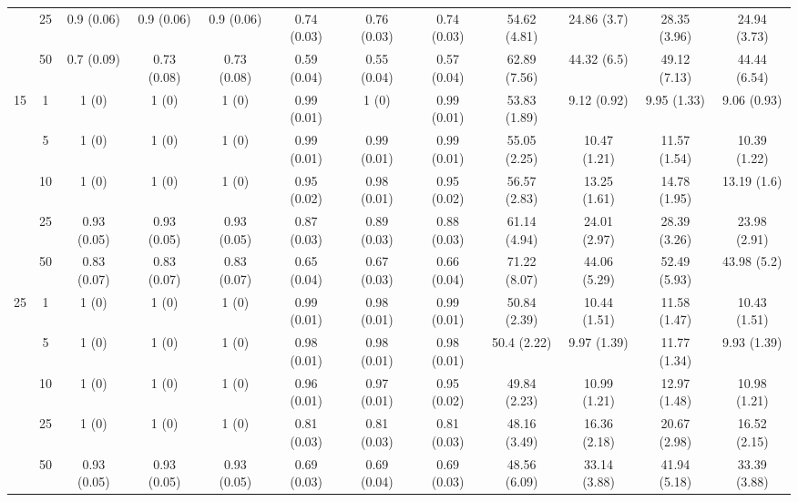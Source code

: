 \documentclass[11pt]{article}
\theoremstyle{definition}
\begin{document}
\begin{landscape}
\begin{table}[b]
\begin{center}
{\begin{tabular}{cc|ccc|ccc|cccc|}
  & 25  & 0.9 (0.06) & 0.9 (0.06) & 0.9 (0.06) & 0.74 (0.03) & 0.76 (0.03) & 0.74 (0.03) & 54.62 (4.81) & 24.86 (3.7) & 28.35 (3.96) & 24.94 (3.73) \\ 
  & 50  & 0.7 (0.09) & 0.73 (0.08) & 0.73 (0.08) & 0.59 (0.04) & 0.55 (0.04) & 0.57 (0.04) & 62.89 (7.56) & 44.32 (6.5) & 49.12 (7.13) & 44.44 (6.54) \\[.3cm] 
 \multirow{5}{*}{15} & 1  & 1 (0) & 1 (0) & 1 (0) & 0.99 (0.01) & 1 (0) & 0.99 (0.01) & 53.83 (1.89) & 9.12 (0.92) & 9.95 (1.33) & 9.06 (0.93) \\ 
  & 5  & 1 (0) & 1 (0) & 1 (0) & 0.99 (0.01) & 0.99 (0.01) & 0.99 (0.01) & 55.05 (2.25) & 10.47 (1.21) & 11.57 (1.54) & 10.39 (1.22) \\ 
  & 10  & 1 (0) & 1 (0) & 1 (0) & 0.95 (0.02) & 0.98 (0.01) & 0.95 (0.02) & 56.57 (2.83) & 13.25 (1.61) & 14.78 (1.95) & 13.19 (1.6) \\ 
  & 25  & 0.93 (0.05) & 0.93 (0.05) & 0.93 (0.05) & 0.87 (0.03) & 0.89 (0.03) & 0.88 (0.03) & 61.14 (4.94) & 24.01 (2.97) & 28.39 (3.26) & 23.98 (2.91) \\ 
  & 50  & 0.83 (0.07) & 0.83 (0.07) & 0.83 (0.07) & 0.65 (0.04) & 0.67 (0.03) & 0.66 (0.04) & 71.22 (8.07) & 44.06 (5.29) & 52.49 (5.93) & 43.98 (5.2) \\[.3cm] 
 \multirow{5}{*}{25} & 1  & 1 (0) & 1 (0) & 1 (0) & 0.99 (0.01) & 0.98 (0.01) & 0.99 (0.01) & 50.84 (2.39) & 10.44 (1.51) & 11.58 (1.47) & 10.43 (1.51) \\ 
  & 5  & 1 (0) & 1 (0) & 1 (0) & 0.98 (0.01) & 0.98 (0.01) & 0.98 (0.01) & 50.4 (2.22) & 9.97 (1.39) & 11.77 (1.34) & 9.93 (1.39) \\ 
  & 10  & 1 (0) & 1 (0) & 1 (0) & 0.96 (0.01) & 0.97 (0.01) & 0.95 (0.02) & 49.84 (2.23) & 10.99 (1.21) & 12.97 (1.48) & 10.98 (1.21) \\ 
  & 25  & 1 (0) & 1 (0) & 1 (0) & 0.81 (0.03) & 0.81 (0.03) & 0.81 (0.03) & 48.16 (3.49) & 16.36 (2.18) & 20.67 (2.98) & 16.52 (2.15) \\ 
    & 50  & 0.93 (0.05) & 0.93 (0.05) & 0.93 (0.05) & 0.69 (0.03) & 0.69 (0.04) & 0.69 (0.03) & 48.56 (6.09) & 33.14 (3.88) & 41.94 (5.18) & 33.39 (3.88) \\
\end{tabular}}
   \end{center}
\end{table}
\end{landscape}




\end{document}
